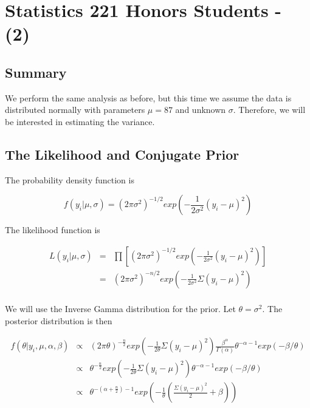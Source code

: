 \documentclass[12pt]{article}
\begin{document}
\newpage

\section{Statistics 221 Honors Students - (2)}

\subsection{Summary}

\noindent We perform the same analysis as before, but this time we assume the data is distributed normally with parameters $\mu=87$ and unknown $\sigma$.  Therefore, we will be interested in estimating the variance.

\subsection{The Likelihood and Conjugate Prior}

\noindent The probability density function is

\[f(y_i|\mu,\sigma)=(2\pi\sigma^2)^{-1/2}exp\left(-\frac{1}{2\sigma^2}(y_i-\mu)^2\right)\]

\noindent The likelihood function is

\begin{eqnarray*}
L(y_i|\mu,\sigma) &=& \prod\left[(2\pi\sigma^2)^{-1/2}exp\left(-\frac{1}{2\sigma^2}(y_i-\mu)^2\right)\right] \\
&=& (2\pi\sigma^2)^{-n/2}exp\left(-\frac{1}{2\sigma^2}\Sigma(y_i-\mu)^2\right) \\
\end{eqnarray*}

\noindent We will use the Inverse Gamma distribution for the prior.  Let $\theta=\sigma^2$.  The posterior distribution is then

\begin{eqnarray*}
f(\theta|y_i,\mu,\alpha,\beta) &\propto& (2\pi\theta)^{-\frac{n}{2}}exp\left(-\frac{1}{2\theta}\Sigma(y_i-\mu)^2\right)\frac{\beta^\alpha}{\Gamma(\alpha)}\theta^{-\alpha-1}exp(-\beta/\theta) \\
&\propto& \theta^{-\frac{n}{2}}exp\left(-\frac{1}{2\theta}\Sigma(y_i-\mu)^2\right)\theta^{-\alpha-1}exp(-\beta/\theta) \\
&\propto& \theta^{-(\alpha+\frac{n}{2})-1}exp\left(-\frac{1}{\theta}\left(\frac{\Sigma(y_i-\mu)^2}{2}+\beta\right)\right) \\
\end{eqnarray*}
\end{document}
